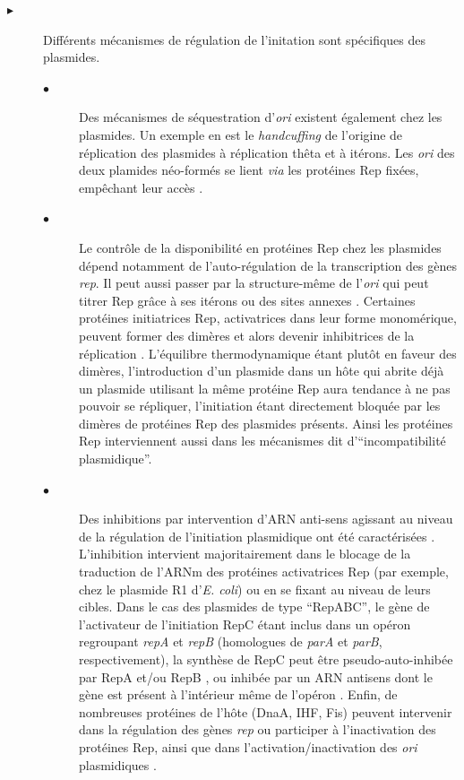 \begin{description}
\item[$\blacktriangleright$] Différents mécanismes de régulation de l'initation sont spécifiques des plasmides.
	\begin{description} 
		\item[$\bullet$]  Des mécanismes de séquestration d'\textit{ori} existent également chez les plasmides. Un exemple en est le \textit{handcuffing} de l'origine de réplication des plasmides à réplication thêta et à itérons. Les \textit{ori} des deux plamides néo-formés se lient \textit{via} les protéines Rep fixées, empêchant leur accès \citep{Kruger2004}.
		\item[$\bullet$]  Le contrôle de la disponibilité en protéines Rep chez les plasmides  dépend notamment de l'auto-régulation de la transcription des gènes \textit{rep}. Il peut aussi passer par la structure-même de l'\textit{ori} qui peut titrer Rep grâce à ses itérons ou des sites annexes \citep{Kruger2004}. Certaines protéines initiatrices Rep, activatrices dans leur forme monomérique, peuvent former des dimères et alors devenir inhibitrices de la réplication \citep{Kruger2004,Cervantes-Rivera2011}. L'équilibre thermodynamique étant plutôt en faveur des dimères, l'introduction d'un plasmide dans un hôte qui abrite déjà un plasmide utilisant la même protéine Rep aura tendance à ne pas pouvoir se répliquer, l'initiation étant directement bloquée par les dimères de protéines Rep des plasmides présents. Ainsi les protéines Rep interviennent aussi dans les mécanismes dit d'“incompatibilité plasmidique”.
		\item[$\bullet$]  Des inhibitions par intervention d'ARN anti-sens agissant au niveau de la régulation de l'initiation plasmidique ont été caractérisées \citep{brantl2004plasmid}. L'inhibition intervient majoritairement dans le blocage de la traduction de l'ARNm des protéines activatrices Rep (par exemple, chez le plasmide R1 d'\textit{E. coli}) ou en se fixant au niveau de leurs cibles. Dans le cas des plasmides de type “RepABC”, le gène de l'activateur de l'initiation RepC étant inclus dans un opéron regroupant \textit{repA} et \textit{repB} (homologues de \textit{parA} et \textit{parB}, respectivement), la synthèse de RepC peut être pseudo-auto-inhibée par RepA et/ou RepB \citep{Pinto2012}, ou inhibée par un ARN antisens dont le gène est présent à l'intérieur même de l'opéron \citep{Cervantes-Rivera2011}. Enfin, de nombreuses protéines de l'hôte (DnaA, IHF, Fis) peuvent intervenir dans la régulation des gènes \textit{rep} ou participer à l'inactivation des protéines Rep, ainsi que dans l'activation/inactivation des \textit{ori} plasmidiques \citep{Kruger2004}. 
	\end{description}
\end{description}


